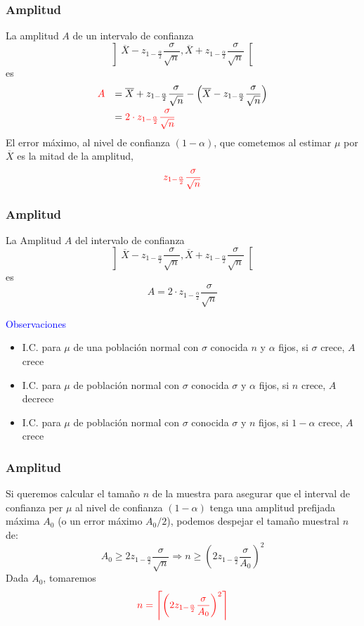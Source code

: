 \documentclass[12pt,t]{beamer}\usepackage[]{graphicx}\usepackage[]{color}
\newcommand{\red}[1]{\textcolor{red}{#1}}
\newcommand{\blue}[1]{\textcolor{blue}{#1}}
\renewcommand{\emph}[1]{{\color{red}#1}}
\renewcommand{\geq}{\geqslant}
\theoremstyle{plain}
\theoremstyle{definition}
\begin{document}
\begin{frame}
\frametitle{Amplitud}

La \emph{amplitud} $A$ de un intervalo de confianza  
$$
\left]\overline{X} -z_{1-\frac{\alpha}{2}} \frac{\sigma}{\sqrt{n}}, \overline{X}+z_{1-\frac{\alpha}{2}}\frac{\sigma}{\sqrt{n}}
\right[
$$
es
$$
\begin{array}{rl}
\red{A}& \displaystyle =\overline{X}+ z_{1-\frac{\alpha}{2}}\frac{\sigma}{\sqrt{n}}-\Big(\overline{X} -z_{1-\frac{\alpha}{2}}\frac{\sigma}{\sqrt{n}}\Big)\\[2ex] & \displaystyle =\red{2\cdot z_{1-\frac{\alpha}{2}}\frac{\sigma}{\sqrt{n}}}
\end{array}
$$
El \emph{error máximo}, al nivel de confianza  $(1-\alpha)$, que cometemos al estimar $\mu$
por  $\overline{X}$ es la mitad de la amplitud, 
$$
\red{z_{1-\frac{\alpha}{2}}\frac{\sigma}{\sqrt{n}}}
$$
\end{frame}

\begin{frame}
\frametitle{Amplitud}

La \emph{Amplitud} $A$ del intervalo de confianza 
$$
\left]\overline{X} -z_{1-\frac{\alpha}{2}} \frac{\sigma}{\sqrt{n}}, \overline{X}+z_{1-\frac{\alpha}{2}}\frac{\sigma}{\sqrt{n}}
\right[
$$
es
$$
A= 2\cdot z_{1-\frac{\alpha}{2}}\frac{\sigma}{\sqrt{n}}
$$

\blue{Observaciones}
\begin{itemize}
\item I.C. para $\mu$ de una población normal con $\sigma$ conocida $n$ y $\alpha$ fijos, si $\sigma$ crece,
 $A$ crece
\smallskip

\item I.C. para $\mu$ de población normal con $\sigma$ conocida $\sigma$ y $\alpha$ fijos, si $n$
crece,  $A$ decrece
\smallskip

\item I.C. para $\mu$ de población normal con $\sigma$ conocida $\sigma$ y $n$ fijos, si
$1-\alpha$ crece, $A$ crece
\end{itemize}
\end{frame}




\begin{frame}
\frametitle{Amplitud}

Si queremos calcular el   tamaño  $n$ de la muestra para asegurar que el interval de confianza  per $\mu$ al nivel de confianza $(1-\alpha)$ tenga una amplitud prefijada máxima $A_0$ (o un
error máximo $A_0/2$), podemos despejar el tamaño muestral  $n$ de:
$$
A_0\geq 2z_{1-\frac{\alpha}{2}}\frac{\sigma}{\sqrt{n}}\Rightarrow
n\geq \left( 2 z_{1-\frac{\alpha}{2}}\frac{\sigma}{A_0}
\right)^2
$$
Dada $A_0$, tomaremos
$$
\red{n=\left\lceil \left( 2 z_{1-\frac{\alpha}{2}}\frac{\sigma}{A_0}
\right)^2\right\rceil}
$$

\end{frame}
\end{document}
